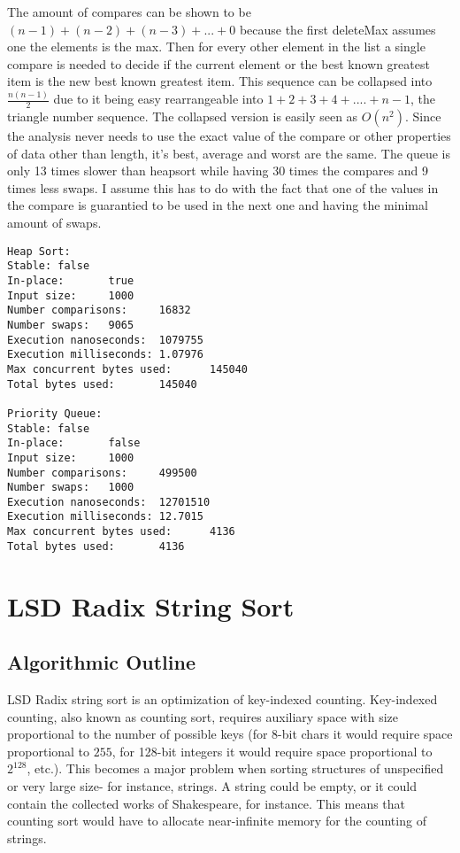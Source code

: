 \documentclass[12pt]{amsart}
\begin{document}
    The amount of compares can be shown to be $(n - 1) + (n - 2) + (n - 3) + ... + 0$ because the first deleteMax assumes one the elements is the max. Then for every other element in the list a single compare is needed to decide if the current element or the best known greatest item is the new best known greatest item.
    This sequence can be collapsed into $\frac{n(n - 1)}{2}$ due to it being easy rearrangeable into $1 + 2 + 3 +4 + .... + n - 1$, the triangle number sequence.
    The collapsed version is easily seen as $O(n^2)$.
    Since the analysis never needs to use the exact value of the compare or other properties of data other than length, it's best, average and worst are the same.
    The queue is only 13 times slower than heapsort while having 30 times the compares and 9 times less swaps.
    I assume this has to do with the fact that one of the values in the compare is guarantied to be used in the next one and having the minimal amount of swaps.
\begin{verbatim}
Heap Sort:
Stable: false
In-place:       true
Input size:     1000
Number comparisons:     16832
Number swaps:   9065
Execution nanoseconds:  1079755
Execution milliseconds: 1.07976
Max concurrent bytes used:      145040
Total bytes used:       145040

Priority Queue:
Stable: false
In-place:       false
Input size:     1000
Number comparisons:     499500
Number swaps:   1000
Execution nanoseconds:  12701510
Execution milliseconds: 12.7015
Max concurrent bytes used:      4136
Total bytes used:       4136
\end{verbatim}

\section{LSD Radix String Sort}

    \subsection{Algorithmic Outline}

    LSD Radix string sort is an optimization of key-indexed
    counting. Key-indexed counting, also known as counting sort,
    requires auxiliary space with size proportional to the
    number of possible keys (for 8-bit chars it would require
    space proportional to $255$, for 128-bit integers it would
    require space proportional to $2^{128}$, etc.). This
    becomes a major problem when sorting structures of
    unspecified or very large size- for instance, strings. A
    string could be empty, or it could contain the collected
    works of Shakespeare, for instance. This means that counting
    sort would have to allocate near-infinite memory for the
    counting of strings.
\end{document}
